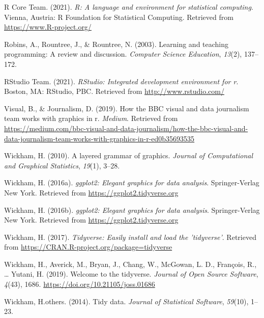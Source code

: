 \documentclass[
  english,
  doc,floatsintext]{apa6}
\newlength{\cslhangindent}
\newlength{\cslentryspacingunit} %
\newenvironment{CSLReferences}[2] %
 {%
  \setlength{\parindent}{0pt}
  \ifodd #1
  \let\oldpar\par
  \def\par{\hangindent=\cslhangindent\oldpar}
  \fi
  \setlength{\parskip}{#2\cslentryspacingunit}
 }%
 {}
\begin{document}
\begin{CSLReferences}{1}{0}
\leavevmode{}%
R Core Team. (2021). \emph{R: A language and environment for statistical computing}. Vienna, Austria: R Foundation for Statistical Computing. Retrieved from \url{https://www.R-project.org/}

\leavevmode{}%
Robins, A., Rountree, J., \& Rountree, N. (2003). Learning and teaching programming: A review and discussion. \emph{Computer Science Education}, \emph{13}(2), 137--172.

\leavevmode{}%
RStudio Team. (2021). \emph{RStudio: Integrated development environment for r}. Boston, MA: RStudio, PBC. Retrieved from \url{http://www.rstudio.com/}

\leavevmode{}%
Visual, B., \& Journalism, D. (2019). How the BBC visual and data journalism team works with graphics in r. \emph{Medium}. Retrieved from \url{https://medium.com/bbc-visual-and-data-journalism/how-the-bbc-visual-and-data-journalism-team-works-with-graphics-in-r-ed0b35693535}

\leavevmode{}%
Wickham, H. (2010). A layered grammar of graphics. \emph{Journal of Computational and Graphical Statistics}, \emph{19}(1), 3--28.

\leavevmode{}%
Wickham, H. (2016a). \emph{ggplot2: Elegant graphics for data analysis}. Springer-Verlag New York. Retrieved from \url{https://ggplot2.tidyverse.org}

\leavevmode{}%
Wickham, H. (2016b). \emph{ggplot2: Elegant graphics for data analysis}. Springer-Verlag New York. Retrieved from \url{https://ggplot2.tidyverse.org}

\leavevmode{}%
Wickham, H. (2017). \emph{Tidyverse: Easily install and load the 'tidyverse'}. Retrieved from \url{https://CRAN.R-project.org/package=tidyverse}

\leavevmode{}%
Wickham, H., Averick, M., Bryan, J., Chang, W., McGowan, L. D., François, R., \ldots{} Yutani, H. (2019). Welcome to the {tidyverse}. \emph{Journal of Open Source Software}, \emph{4}(43), 1686. \url{https://doi.org/10.21105/joss.01686}

\leavevmode{}%
Wickham, H.others. (2014). Tidy data. \emph{Journal of Statistical Software}, \emph{59}(10), 1--23.


\end{CSLReferences}
\end{document}
